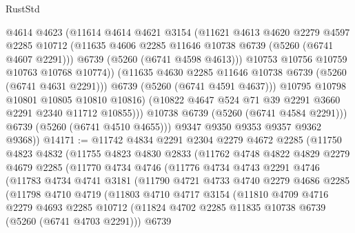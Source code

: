 \begin{lexlean}{RustStd}
\begin{coremodule}
                      @4614
                      @4623
                      (@11614
                        @4614
                        @4621
                        @3154
                        (@11621
                          @4613
                          @4620
                          @2279
                          @4597
                          @2285
                          @10712
                          (@11635 @4606 @2285 @11646 @10738 @6739 (@5260 (@6741 @4607 @2291)))
                          @6739
                          (@5260 (@6741 @4598 @4613)))
                        @10753
                        @10756
                        @10759
                        @10763
                        @10768
                        @10774))
                    (@11635 @4630 @2285 @11646 @10738 @6739 (@5260 (@6741 @4631 @2291)))
                    @6739
                    (@5260 (@6741 @4591 @4637)))
                  @10795
                  @10798
                  @10801
                  @10805
                  @10810
                  @10816)
                (@10822 @4647 @524 @71 @39 @2291 @3660 @2291 @2340 @11712 @10855)))
            @10738
            @6739
            (@5260 (@6741 @4584 @2291)))
          @6739
          (@5260 (@6741 @4510 @4655)))
        @9347
        @9350
        @9353
        @9357
        @9362
        @9368))
@14171 := @11742
    @4834
    @2291
    @2304
    @2279
    @4672
    @2285
    (@11750
      @4823
      @4832
      (@11755
        @4823
        @4830
        @2833
        (@11762
          @4748
          @4822
          @4829
          @2279
          @4679
          @2285
          (@11770
            @4734
            @4746
            (@11776
              @4734
              @4743
              @2291
              @4746
              (@11783
                @4734
                @4741
                @3181
                (@11790
                  @4721
                  @4733
                  @4740
                  @2279
                  @4686
                  @2285
                  (@11798
                    @4710
                    @4719
                    (@11803
                      @4710
                      @4717
                      @3154
                      (@11810
                        @4709
                        @4716
                        @2279
                        @4693
                        @2285
                        @10712
                        (@11824 @4702 @2285 @11835 @10738 @6739 (@5260 (@6741 @4703 @2291)))
                        @6739

\end{coremodule}
\end{lexlean}
